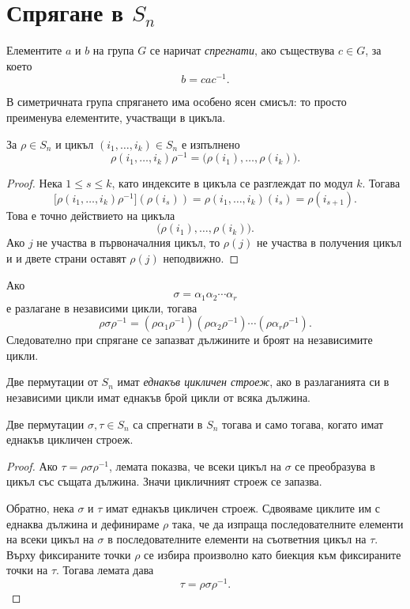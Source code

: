 \section{Спрягане в $S_n$}\label{s:31.2}

\begin{defn}
Елементите $a$ и $b$ на група $G$ се наричат \emph{спрегнати}, ако съществува $c\in G$, за което
\[
b=cac^{-1}.
\]
\end{defn}

В симетричната група спрягането има особено ясен смисъл: то просто преименува елементите, участващи в цикъла.

\begin{lem}
За $\rho\in S_n$ и цикъл $(i_1,\ldots,i_k)\in S_n$ е изпълнено
\[
\rho(i_1,\ldots,i_k)\rho^{-1}
=
\bigl(\rho(i_1),\ldots,\rho(i_k)\bigr).
\]
\end{lem}

\begin{proof}
Нека $1\le s\le k$, като индексите в цикъла се разглеждат по модул $k$. Тогава
\[
\bigl[\rho(i_1,\ldots,i_k)\rho^{-1}\bigr](\rho(i_s))
=
\rho(i_1,\ldots,i_k)(i_s)
=
\rho(i_{s+1}).
\]
Това е точно действието на цикъла
\[
\bigl(\rho(i_1),\ldots,\rho(i_k)\bigr).
\]
Ако $j$ не участва в първоначалния цикъл, то $\rho(j)$ не участва в получения цикъл и и двете страни оставят $\rho(j)$ неподвижно.
\end{proof}

Ако
\[
\sigma=\alpha_1\alpha_2\cdots\alpha_r
\]
е разлагане в независими цикли, тогава
\[
\rho\sigma\rho^{-1}
=
(\rho\alpha_1\rho^{-1})
(\rho\alpha_2\rho^{-1})
\cdots
(\rho\alpha_r\rho^{-1}).
\]
Следователно при спрягане се запазват дължините и броят на независимите цикли.

\begin{defn}
Две пермутации от $S_n$ имат \emph{еднакъв цикличен строеж}, ако в разлаганията си в независими цикли имат еднакъв брой цикли от всяка дължина.
\end{defn}

\begin{prop}
Две пермутации $\sigma,\tau\in S_n$ са спрегнати в $S_n$ тогава и само тогава, когато имат еднакъв цикличен строеж.
\end{prop}

\begin{proof}
Ако $\tau=\rho\sigma\rho^{-1}$, лемата показва, че всеки цикъл на $\sigma$ се преобразува в цикъл със същата дължина. Значи цикличният строеж се запазва.

Обратно, нека $\sigma$ и $\tau$ имат еднакъв цикличен строеж. Сдвояваме циклите им с еднаква дължина и дефинираме $\rho$ така, че да изпраща последователните елементи на всеки цикъл на $\sigma$ в последователните елементи на съответния цикъл на $\tau$. Върху фиксираните точки $\rho$ се избира произволно като биекция към фиксираните точки на $\tau$. Тогава лемата дава
\[
\tau=\rho\sigma\rho^{-1}.
\]
\end{proof}

